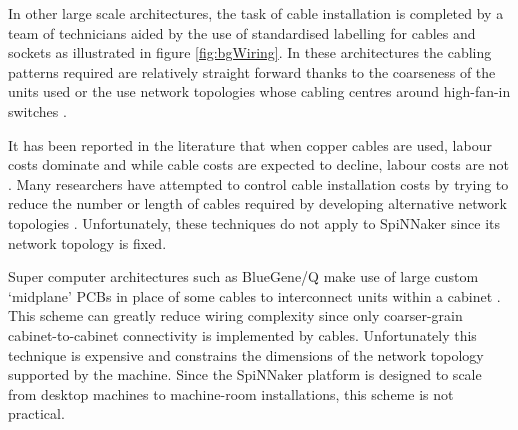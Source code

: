 			In other large scale architectures, the task of cable installation is
			completed by a team of technicians aided by the use of standardised
			labelling for cables and sockets \cite{tia2006} as illustrated in figure
			\ref{fig:bgWiring}. In these architectures the cabling patterns required
			are relatively straight forward thanks to the coarseness of the units
			used \cite{lakner07} or the use network topologies whose cabling centres
			around high-fan-in switches \cite{cisco07,csernai15}.
			
			It has been reported in the literature that when copper cables are used,
			labour costs dominate \cite{popa10} and while cable costs are expected to
			decline, labour costs are not \cite{mudigonda11}. Many researchers have
			attempted to control cable installation costs by trying to reduce the
			number or length of cables required by developing alternative network
			topologies \cite{curtis12, popa10, mudigonda11}.  Unfortunately, these
			techniques do not apply to SpiNNaker since its network topology is fixed.
			
			Super computer architectures such as BlueGene/Q make use of large custom
			`midplane' PCBs in place of some cables to interconnect units within a
			cabinet \cite{prickett10}. This scheme can greatly reduce wiring
			complexity since only coarser-grain cabinet-to-cabinet connectivity is
			implemented by cables. Unfortunately this technique is expensive and
			constrains the dimensions of the network topology supported by the
			machine. Since the SpiNNaker platform is designed to scale from desktop
			machines to machine-room installations, this scheme is not practical.
			
